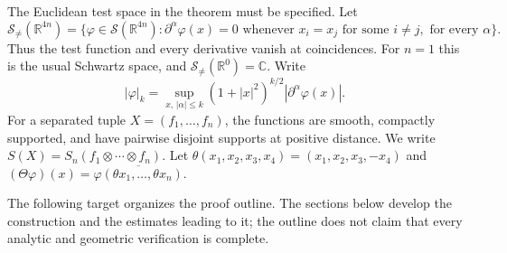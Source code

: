 \documentclass[11pt,letterpaper,reqno]{amsart}
\theoremstyle{definition}
\theoremstyle{remark}
\newcommand{\R}{\mathbb R}
\newcommand{\cS}{\mathcal S}
\begin{document}
The Euclidean test space in the theorem must be specified. Let
\begin{equation}\label{eq:flat-space}
 \cS_{\ne}(\R^{4n})
 =\{\varphi\in\cS(\R^{4n}):
   \partial^\alpha\varphi(x)=0\text{ whenever }x_i=x_j
   \text{ for some }i\ne j,\text{ for every }\alpha\}.
\end{equation}
Thus the test function and every derivative vanish at coincidences.
For $n=1$ this is the usual Schwartz space, and $\cS_{\ne}(\R^0)=\mathbb C$.
Write
\[
 |\varphi|_k=
 \sup_{x,\,|\alpha|\le k}(1+|x|^2)^{k/2}|\partial^\alpha\varphi(x)|.
\]
For a separated tuple $X=(f_1,\ldots,f_n)$, the functions are smooth,
compactly supported, and have pairwise disjoint supports at positive
distance. We write $S(X)=S_n(f_1\otimes\cdots\otimes f_n)$.
Let $\theta(x_1,x_2,x_3,x_4)=(x_1,x_2,x_3,-x_4)$ and
$(\Theta\varphi)(x)=\overline{\varphi(\theta x_1,\ldots,\theta x_n)}$.

The following target organizes the proof outline. The sections below
develop the construction and the estimates leading to it; the outline
does not claim that every analytic and geometric verification is
complete.
\end{document}
